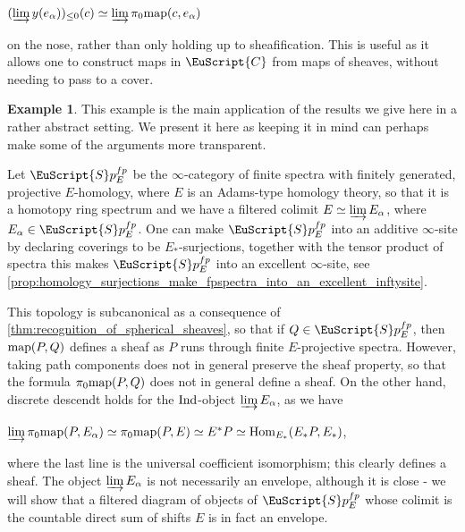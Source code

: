 \documentclass[oneside,a4paper]{amsart}
\newcommand{\euscr}[1]{\EuScript{#1}} %
\newcommand{\ccat}{\euscr{C}} %
\newcommand{\Hom}{\textnormal{Hom}} %
\newcommand{\Ind}{\textnormal{Ind}} %
\newcommand{\map}{\textnormal{map}} %
\newcommand{\spectra}{\euscr{S}p} %
\newcommand{\spectrafp}{\spectra_{E}^{fp}} %
\theoremstyle{plain}
\theoremstyle{definition}
\newtheorem{example}[thm]{Example}
\theoremstyle{remark}
\begin{document}
\begin{center}
$(\varinjlim y(e_{\alpha}))_{\leq 0}(c) \simeq \varinjlim \pi_{0} \map(c, e_{\alpha})$
\end{center}
on the nose, rather than only holding up to sheafification. This is useful as it allows one to construct maps in $\ccat$ from maps of sheaves, without needing to pass to a cover. 

\begin{example}
\label{example:envelope_in_an_excellent_infinity_site}
This example is the main application of the results we give here in a rather abstract setting. We present it here as keeping it in mind can perhaps make some of the arguments more transparent. 

Let $\spectrafp$ be the $\infty$-category of finite spectra with finitely generated, projective $E$-homology, where $E$ is an Adams-type homology theory, so that it is a homotopy ring spectrum and we have a filtered colimit $E \simeq \varinjlim E_{\alpha}$, where $E_{\alpha} \in \spectrafp$. One can make $\spectrafp$ into an additive $\infty$-site by declaring coverings to be $E_{*}$-surjections, together with the tensor product of spectra this makes $\spectrafp$ into an excellent $\infty$-site, see \cref{prop:homology_surjections_make_fpspectra_into_an_excellent_inftysite}. 

This topology is subcanonical as a consequence of \cref{thm:recognition_of_spherical_sheaves}, so that if $Q \in \spectrafp$, then $\map(P, Q)$ defines a sheaf as $P$ runs through finite $E$-projective spectra. However, taking path components does not in general preserve the sheaf property, so that the formula $\pi_{0} \map(P, Q)$ does not in general define a sheaf. On the other hand, discrete descendt holds for the $\Ind$-object $\varinjlim E_{\alpha}$, as we have

\begin{center}
$\varinjlim \pi_{0} \map(P, E_{\alpha}) \simeq \pi_{0} \map(P, E) \simeq E^{*}P \simeq \Hom_{E_{*}}(E_{*}P, E_{*})$,
\end{center}
where the last line is the universal coefficient isomorphism; this clearly defines a sheaf. The object  $\varinjlim E_{\alpha}$ is not necessarily an envelope, although it is close - we will show that a filtered diagram of objects of $\spectrafp$ whose colimit is the countable direct sum of shifts $E$ is in fact an envelope. 
\end{example}
\end{document}
